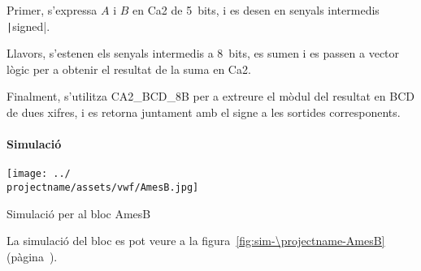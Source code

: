 


Primer, s'expressa $A$ i $B$ en Ca2 de 5~bits, i es desen en senyals intermedis \texttt|signed|.

Llavors, s'estenen els senyals intermedis a 8~bits, es sumen
i es passen a vector lògic per a obtenir el resultat de la suma en Ca2.

Finalment, s'utilitza \textsf{CA2\_BCD\_8B} per a extreure el mòdul del resultat en BCD de dues xifres,
i es retorna juntament amb el signe a les sortides corresponents.

\paragraph{Simulació}

\begin{contendfig}
  \begin{center}
    \texttt{[image: ../\\projectname/assets/vwf/AmesB.jpg]}
  \end{center}
  \caption{\label{fig:sim-\projectname-AmesB} Simulació per al bloc \textsf{AmesB}}
\end{contendfig}

La simulació del bloc es pot veure a la figura~\ref{fig:sim-\projectname-AmesB} (pàgina~\pageref{fig:sim-\projectname-AmesB}).


\vspace{1cm}
